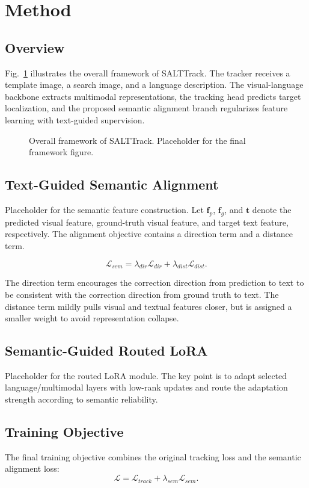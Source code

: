 \section{Method}
\subsection{Overview}
Fig.~\ref{fig:framework} illustrates the overall framework of SALTTrack. The tracker receives a template image, a search image, and a language description. The visual-language backbone extracts multimodal representations, the tracking head predicts target localization, and the proposed semantic alignment branch regularizes feature learning with text-guided supervision.

\begin{figure}[t]
    \centering
    \fbox{\rule{0pt}{1.2in}\rule{0.92\linewidth}{0pt}}
    \caption{Overall framework of SALTTrack. Placeholder for the final framework figure.}
    \label{fig:framework}
\end{figure}

\subsection{Text-Guided Semantic Alignment}
Placeholder for the semantic feature construction. Let $\mathbf{f}_p$, $\mathbf{f}_g$, and $\mathbf{t}$ denote the predicted visual feature, ground-truth visual feature, and target text feature, respectively. The alignment objective contains a direction term and a distance term.

\begin{equation}
    \mathcal{L}_{sem} =
    \lambda_{dir}\mathcal{L}_{dir} +
    \lambda_{dist}\mathcal{L}_{dist}.
\end{equation}

The direction term encourages the correction direction from prediction to text to be consistent with the correction direction from ground truth to text. The distance term mildly pulls visual and textual features closer, but is assigned a smaller weight to avoid representation collapse.

\subsection{Semantic-Guided Routed LoRA}
Placeholder for the routed LoRA module. The key point is to adapt selected language/multimodal layers with low-rank updates and route the adaptation strength according to semantic reliability.

\subsection{Training Objective}
The final training objective combines the original tracking loss and the semantic alignment loss:
\begin{equation}
    \mathcal{L} =
    \mathcal{L}_{track} +
    \lambda_{sem}\mathcal{L}_{sem}.
\end{equation}

